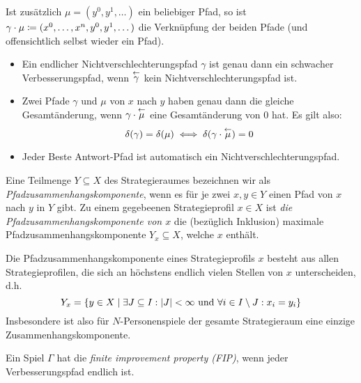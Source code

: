 \begin{defn}
	Ist zusätzlich $\mu = (y^0, y^1, \dots)$ ein beliebiger Pfad, so ist $\gamma\cdot\mu \coloneqq (x^0, \dots, x^n, y^0, y^1, \dots)$ die Verknüpfung der beiden Pfade (und offensichtlich selbst wieder ein Pfad).
\end{defn}

\begin{beob}
	\begin{itemize}
		\item Ein endlicher Nichtverschlechterungspfad $\gamma$ ist genau dann ein schwacher Verbesserungspfad, wenn $\overset{\leftarrow}{\gamma}$ kein Nichtverschlechterungspfad ist. 
		
		\item Zwei Pfade $\gamma$ und $\mu$ von $x$ nach $y$ haben genau dann die gleiche Gesamtänderung, wenn $\gamma\cdot\overset{\leftarrow}{\mu}$ eine Gesamtänderung von $0$ hat. Es gilt also: 
		\[\delta(\gamma) = \delta(\mu) \iff \delta(\gamma\cdot\overset{\leftarrow}{\mu})=0 \]
		
		\item Jeder Beste Antwort-Pfad ist automatisch ein Nichtverschlechterungspfad.
	\end{itemize}
\end{beob}

\begin{defn}
	Eine Teilmenge $Y \subseteq X$ des Strategieraumes bezeichnen wir als \emph{Pfadzusammenhangskomponente}, wenn es für je zwei $x, y \in Y$ einen Pfad von $x$ nach $y$ in $Y$ gibt. Zu einem gegebeenen Strategieprofil $x \in X$ ist \emph{die Pfadzusammenhangskomponente von $x$} die (bezüglich Inklusion) maximale Pfadzusammenhangskomponente $Y_x \subseteq X$, welche $x$ enthält.
\end{defn}

\begin{beob}
	Die Pfadzusammenhangskomponente eines Strategieprofils $x$ besteht aus allen Strategieprofilen, die sich an höchstens endlich vielen Stellen von $x$ unterscheiden, d.h.
		\[Y_x = \left\{y \in X \mid \exists J \subseteq I: \left|J\right| < \infty \text{ und } \forall i \in I\setminus J: x_i = y_i \right\} \]
	Insbesondere ist also für $N$-Personenspiele der gesamte Strategieraum eine einzige Zusammenhangskomponente.
\end{beob}

\begin{defn}
	Ein Spiel $\Gamma$ hat die \emph{finite improvement property (FIP)}, wenn jeder Verbesserungspfad endlich ist.
\end{defn}

